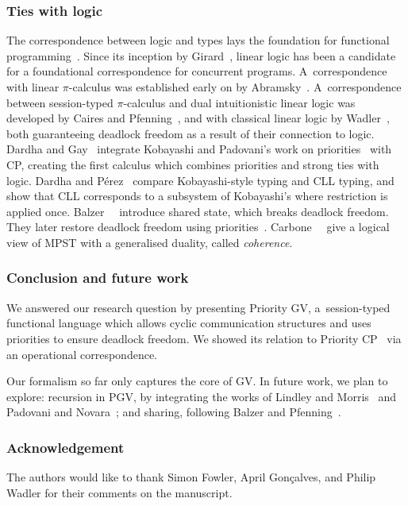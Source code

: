 \documentclass[main.tex]{subfiles}
\begin{document}
\subsubsection*{Ties with logic}
The correspondence between logic and types lays the foundation for functional programming~\cite{wadler15}. Since its inception by Girard~\cite{girard87}, linear logic has been a candidate for a foundational correspondence for concurrent programs. A~correspondence with linear $\pi$-calculus was established early on by Abramsky~\cite{abramsky94,bellinscott94}. A~correspondence between session-typed $\pi$-calculus and dual intuitionistic linear logic was developed by Caires and Pfenning~\cite[$\pi\text{DILL}$]{cairespfenning10}, and with classical linear logic by Wadler~\cite[CP]{wadler15}, both guaranteeing deadlock freedom as a result of their connection to logic. Dardha and Gay~\cite[PCP]{dardhagay18} integrate Kobayashi and Padovani's work on priorities~\cite{kobayashi06,padovani14} with CP, creating the first calculus which combines priorities and strong ties with logic. Dardha and P\'{e}rez~\cite{dardhaperez15} compare Kobayashi-style typing and CLL typing, and show that CLL corresponds to a subsystem of Kobayashi's where restriction is applied once. Balzer~\etal~\cite[$\text{SILL}_S$]{balzerpfenning17} introduce shared state, which breaks deadlock freedom. They later restore deadlock freedom using priorities~\cite[$\text{SILL}_{S+}$]{balzertoninho19}.
Carbone~\etal~\cite{CarboneMSY15,carbonelindley16} give a logical view of MPST with a generalised duality, called \emph{coherence}.

\subsubsection*{Conclusion and future work}
We answered our research question by presenting Priority GV, a~session-typed functional language which allows cyclic communication structures and uses priorities to ensure deadlock freedom. We showed its relation to Priority CP~\cite{dardhagay18} via an operational correspondence.

Our formalism so far only captures the core of GV. In future work, we plan to explore: recursion in PGV, by integrating the works of Lindley and Morris~\cite{lindleymorris16} and Padovani and Novara~\cite{padovaninovara15}; %
and sharing, following Balzer and Pfenning~\cite{balzerpfenning17}.

\subsubsection*{Acknowledgement}
The authors would like to thank Simon Fowler, April Gon\c{c}alves, and Philip Wadler for their comments on the manuscript.
\end{document}
